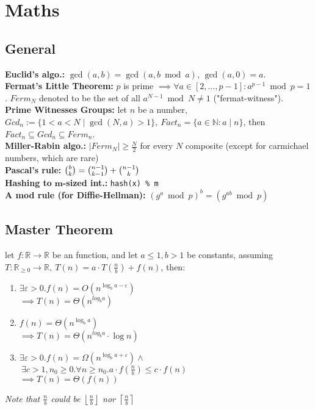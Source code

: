 \documentclass[]{article}
\newcommand\fortitle[1] {\Large #1 \normalsize}
\newcommand\N     {\mathbb{N}}
\newcommand\R     {\mathbb{R}}
\newcommand\vepsi {\varepsilon}
\newcommand\rc    {\right\rceil}
\newcommand\lc    {\left\lceil}
\newcommand\rf    {\right\rfloor}
\newcommand\lf    {\left\lfloor}
\newcommand\logn  {\log n}
\begin{document}
	\section{\fortitle{Maths}}
	\begin{multicols}{2}
		
		\subsection{General}
		\textbf{Euclid's algo.: }$ \gcd(a, b) = \gcd(a, b \bmod a) $, $ \gcd(a, 0) = a $. \\
		\textbf{Fermat’s Little Theorem: }$ p $ is prime $ \implies \forall a \in [2, \dots, p - 1]: a^{p - 1} \bmod p = 1 $. $ Ferm_N $ denoted to be the set of all $ a^{N - 1}\bmod N \neq 1 $ ("fermat-witness"). \\
		\textbf{Prime Witnesses Groups: }let $ n $ be a number, $ Gcd_n := \{1 \! < \! a \! < \! N \mid \gcd(N, a) > 1\}, \ Fact_n = \{a \in \N \colon a \mid n\}$, then $ Fact_n \subseteq Gcd_n \subseteq Ferm_n $.  \\
		\textbf{Miller-Rabin algo.: }$ |Ferm_N| \ge \tfrac{N}{2}$ for every $ N $ composite (except for carmichael numbers, which are rare) \\
		\textbf{Pascal's rule: }$ \tbinom{b}{k} =  \tbinom{n - 1}{k - 1} + \tbinom{n - 1}{k} $ \\
		\textbf{Hashing to }$ \bm{m} $\textbf{-sized int.: }\texttt{hash(x) \% m} \\
		\textbf{A mod rule \scriptsize{(for Diffie-Hellman)}: }$ (g^a \bmod p)^b = (g^{ab} \bmod p) $
		
		\subsection{Master Theorem}
		let $ f \colon \R \to \R $ be an function, and let $ a \le 1, b >1 $ be constants, assuming $ T \colon \R_{\ge 0} \to \R, \ T(n) = a \cdot T\left (\tfrac{n}{b} \right ) + f(n)$, then: 
		\begin{enumerate}
			\item $ \exists \vepsi > 0. f(n) = O(n^{\log_b a - \vepsi}) $ \\ $\implies T(n) = \Theta(n^{log_b a}) $
			\item $ f(n) = \Theta(n^{\log_b a}) $ \\ $\implies T(n) = \Theta(n^{log_b a} \cdot \logn) $
			\item $ \exists \vepsi > 0. f(n) = \Omega(n^{\log_b a + \vepsi}) \land $ \\
			$\ \exists c>1, n_0 \ge 0. \forall n \ge n_0. a \cdot f(\tfrac{n}{b}) \le c \cdot f(n) $ \\
			$\implies T(n) = \Theta(f(n)) $
		\end{enumerate}
		\textit{Note that $ \mathit{\tfrac{n}{b}} $ could be $ \mathit{\lf \tfrac{n}{b} \rf} $ nor $ \mathit{\lc \tfrac{n}{b} \rc} $}
		

\end{multicols}
\end{document}
